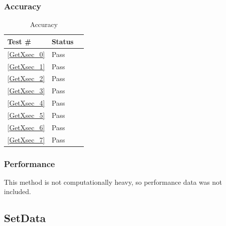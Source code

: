 \documentclass[12pt]{article}
\begin{document}
	\subsubsection{Accuracy}
		\begin{table}[H]
		\centering
		\caption{Accuracy}\label{GetY_acc}
		\begin{tabular}{lll}
		\toprule
		\bf Test \# & Status \\\midrule
		\ref{GetXsec_0} & Pass\\
		\ref{GetXsec_1} & Pass\\
		\ref{GetXsec_2} & Pass\\
		\ref{GetXsec_3} & Pass\\
		\ref{GetXsec_4} & Pass\\
		\ref{GetXsec_5} & Pass\\
		\ref{GetXsec_6} & Pass\\
		\ref{GetXsec_7} & Pass\\
		\bottomrule
		\end{tabular}
		\end{table}
	\subsubsection{Performance}
		This method is not computationally heavy, so performance data was not included.
		
\subsection{SetData}
\end{document}
